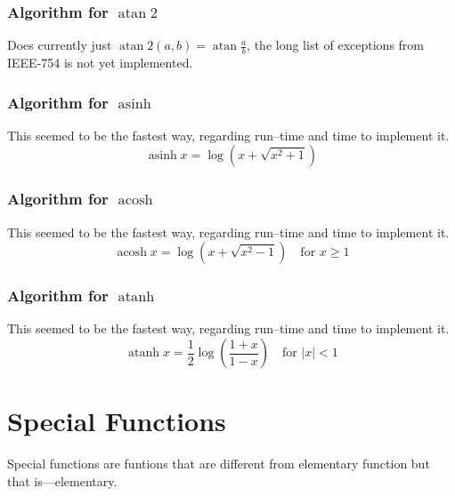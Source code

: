 \documentclass[a4paper]{book}
\theoremstyle{definition}
\theoremstyle{remark}
\DeclareMathOperator{\atan}{atan}
\DeclareMathOperator{\atanh}{atanh}
\DeclareMathOperator{\asinh}{asinh}
\DeclareMathOperator{\acosh}{acosh}
\begin{document}
\subsection{Algorithm for $\atan2$}
Does currently just $\atan2 \left (a,b\right) = \atan \frac{a}{b} $, the long list of exceptions from IEEE-754 is not yet implemented.


\subsection{Algorithm for $\asinh$}
This seemed to be the fastest way, regarding run--time and time to implement it.
\begin{equation}
\asinh x = \log \left(x + \sqrt{x^2 + 1} \right)
\end{equation}
\subsection{Algorithm for $\acosh$}
This seemed to be the fastest way, regarding run--time and time to implement it.
\begin{equation}
\acosh x = \log \left(x + \sqrt{x^2 - 1} \right)\quad\text{for } x \ge 1
\end{equation}
\subsection{Algorithm for $\atanh$}
This seemed to be the fastest way, regarding run--time and time to implement it.
\begin{equation}
\atanh x = \frac{1}{2}\log \left( \frac{1 + x}{1 - x} \right)\quad\text{for } |x| < 1
\end{equation}

\chapter{Special Functions}
Special functions are funtions that are different from elementary function but that is---elementary.
\end{document}
